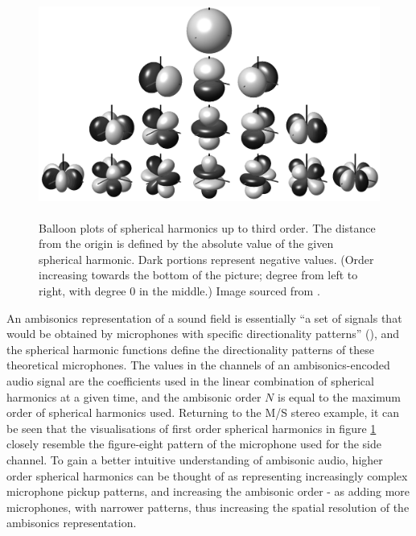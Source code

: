 \begin{figure}
    \begin{center}
        \includegraphics[height=20em]{images/spatial_audio/spherical_harmonics.png}       
        \caption{Balloon plots of spherical harmonics up to third order.
        The distance from the origin is defined by the absolute value of the given spherical harmonic.
        Dark portions represent negative values. (Order increasing towards the bottom of the picture; degree from left to right, with degree 0 in the middle.) 
        Image sourced from \cite{spherical_harm_pic_wiki}.\label{fig:spherical_harmonics}}
    \end{center}
\end{figure}

An ambisonics representation of a sound field is essentially ``a set of signals that would be obtained by microphones with specific directionality patterns'' 
(\cite{dickins_thesis}), and the spherical harmonic functions define the directionality patterns of these theoretical microphones. 
The values in the channels of an ambisonics-encoded audio signal 
are the coefficients used in the linear combination of spherical harmonics at a given time,
and the ambisonic order $N$ is equal to the maximum order of spherical harmonics used.
Returning to the M/S stereo example, it can be seen that the visualisations of first order spherical harmonics in figure \ref{fig:spherical_harmonics} 
closely resemble the figure-eight pattern of the microphone used
for the side channel. To gain a better intuitive understanding of ambisonic audio, 
higher order spherical harmonics can be thought of as representing increasingly complex microphone pickup patterns, 
and increasing the ambisonic order - as adding more microphones, with narrower patterns,
thus increasing the spatial resolution of the ambisonics representation.

